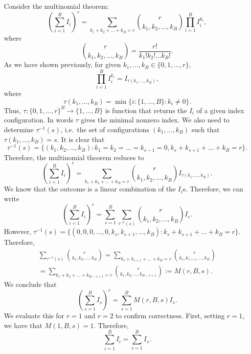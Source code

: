 \documentclass[12pt]{article}
\begin{document}
Consider the multinomial theorem: 
$$ \left( \sum_{i=1}^B I_i \right)^r = \sum_{k_1 + k_2 + \dots + k_B = r} \binom{ r }{ k_1, k_2, \dots, k_B } \prod_{i=1}^B I_{i}^{k_i},$$ where $$ \binom{r}{k_1, k_2, \dots, k_B} = \frac{r!}{k_1! k_2! \dots k_B!}.$$
As we have shown previously, for given $k_1, \dots, k_B \in \{0, 1, \dots, r\},$
$$ \prod_{i=1}^B I_i^{k_i} = I_{\tau(k_1, \dots, k_B)},$$ where $$\tau(k_1, \dots, k_B) = \min\{i : \{1, \dots, B\} : k_i \neq 0 \}.$$ Thus, $\tau : \{0, 1, \dots, r\}^B \to \{1, \dots, B\}$ is function that returns the $I_i$ of a given index configuration. In words $\tau$ gives the minimal nonzero index. We also need to determine $\tau^{-1}(s)$, i.e.\ the set of configurations $(k_1, \dots, k_B)$ such that $\tau(k_1, \dots, k_B) = s.$ It is clear that
$$ \tau^{-1}(s) = \{ (k_1, k_2, \dots, k_B) : k_1 = k_2 = \dots = k_{s-1} = 0, k_s + k_{s+1} + \dots + k_B = r\}.$$
Therefore, the multinomial theorem reduces to
$$\left( \sum_{i=1}^B I_i \right)^r = \sum_{k_1 + k_2 + \dots + k_B = r} \binom{ r }{ k_1, k_2, \dots, k_B } I_{\tau(k_1, \dots, k_B)}.$$ We know that the outcome is a linear combination of the $I_i$s. Therefore, we can write
$$ \left( \sum_{i=1}^B I_i \right)^r = \sum_{s=1}^B \sum_{ \tau^{-1}(s)} \binom{r}{ k_1, k_2, \dots, k_B } I_s.$$ However, $\tau^{-1}(s) = \{(0, 0, 0, \dots, 0, k_s, k_{s+1}, \dots, k_B) : k_s + k_{s+1} + \dots + k_B = r\}.$ Therefore,
\begin{multline*}
\sum_{\tau^{-1}(s)} \binom{r}{k_1, k_2, \dots, k_B} = \sum_{k_s + k_{s+1} + \dots + k_B = r}  \binom{r}{k_s, k_{s+1}, \dots, k_B} \\ = \sum_{k_1 + k_2 + \dots + k_{B-s + 1} = r} \binom{r}{ k_1, k_2, \dots, k_{B-s+1}} := M(r,B,s).
\end{multline*}
We conclude that
$$ \left( \sum_{s=1}^B I_s \right)^r = \sum_{s=1}^B M(r,B,s) I_s.$$
We evaluate this for $r=1$ and $r=2$ to confirm correctness. First, setting $r=1$, we have that $M(1,B,s) = 1$. Therefore,
$$ \sum_{i=1}^B I_i = \sum_{s=1}^B I_s.$$

\end{document}
